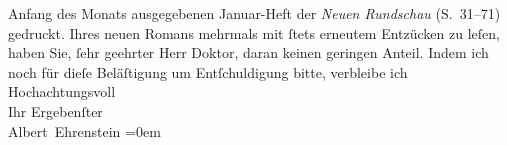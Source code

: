 \begin{ledgroupsized}[t]{13cm}
{{{                  Anfang des Monats ausgegebenen Januar-Heft der \emph{Neuen Rundschau} (S. 31–71) gedruckt.}}}\label{K_L01751_2h} Ihres
               neuen Romans mehrmals mit ſtets
               erneutem Entzücken zu leſen, haben Sie, ſehr geehrter Herr Doktor, daran keinen
               geringen Anteil.\pend
           \pstart
           {\pb}Indem ich noch für dieſe Beläſtigung um
               Entſchuldigung bitte, verbleibe ich\pend
           \pstart
           Hochachtungsvoll{\\[\baselineskip]}Ihr Ergebenſter{\\[\baselineskip]}\spacefill\mbox{Albert Ehrenstein}\pend
           \leftskip=0em{}\endnumbering{}\end{ledgroupsized}  \newcommand{\dateiname}{L01751}\newcommand{\titel}{Albert Ehrenstein an Arthur Schnitzler, 16. 1. 1908}\newcommand{\editorInnen}{Martin Anton Müller und Gerd-Hermann Susen}
      